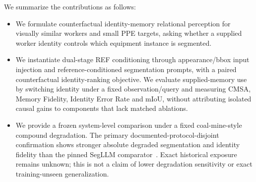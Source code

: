 We summarize the contributions as follows:
\begin{itemize}
\item We formulate counterfactual identity-memory relational perception for
visually similar workers and small PPE targets, asking whether a supplied
worker identity controls which equipment instance is segmented.
\item We instantiate dual-stage REF conditioning through appearance/bbox input
injection and reference-conditioned segmentation prompts, with a paired
counterfactual identity-ranking objective. We evaluate supplied-memory use by
switching identity under a fixed observation/query and measuring CMSA, Memory
Fidelity, Identity Error Rate and mIoU, without attributing isolated causal
gains to components that lack matched ablations.
\item We provide a frozen system-level comparison under a fixed coal-mine-style
compound degradation. The primary documented-protocol-disjoint confirmation
shows stronger absolute degraded segmentation and identity fidelity than the
pinned SegLLM comparator~\cite{wang2025segllm}. Exact historical exposure remains unknown; this is
not a claim of lower degradation sensitivity or exact training-unseen
generalization.
\end{itemize}
